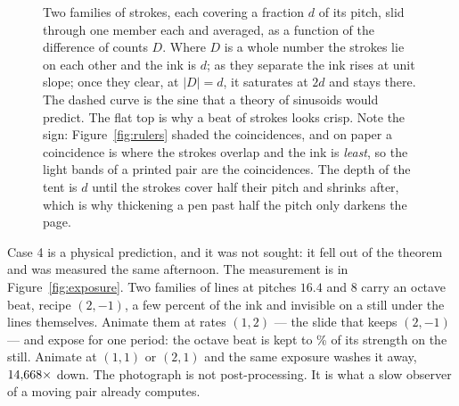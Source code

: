 \begin{figure}[t]
  \centering
  \caption{
  Two families of strokes, each covering a fraction $d$ of its pitch, slid
  through one member each and averaged, as a function of the difference of
  counts $D$. Where $D$ is a whole number the strokes lie on each other and
  the ink is $d$; as they separate the ink rises at unit slope; once they
  clear, at $|D|=d$, it saturates at $2d$ and stays there. The dashed curve is
  the sine that a theory of sinusoids would predict. The flat top is why a
  beat of strokes looks crisp. Note the sign: Figure~\ref{fig:rulers} shaded
  the coincidences, and on paper a coincidence is where the strokes
  overlap and the ink is \emph{least}, so the light bands of a printed pair
  are the coincidences. The depth of the tent is $d$ until the strokes
  cover half their pitch and shrinks after, which is why thickening a pen
  past half the pitch only darkens the page.}
  \label{fig:tent}
\end{figure}

Case 4 is a physical prediction, and it was not sought: it fell out of the
theorem and was measured the same afternoon. The measurement is in
Figure~\ref{fig:exposure}. Two families of lines at pitches $16.4$ and $8$
carry an octave beat, recipe $(2,-1)$, a few percent of the ink and
invisible on a still under the lines themselves. Animate them at rates
$(1,2)$ --- the slide that keeps $(2,-1)$ --- and expose for one period: the
octave beat is kept to \exposureFaithfulPct\% of its strength on the still.
Animate at $(1,1)$ or $(2,1)$ and the same exposure washes it away,
$14{,}668\times$ down. The photograph is not post-processing. It is
what a slow observer of a moving pair already computes.

